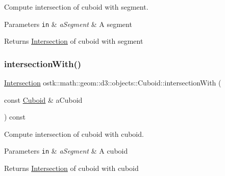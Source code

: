 Compute intersection of cuboid with segment. 


\begin{DoxyParams}[1]{Parameters}
\mbox{\tt in}  & {\em a\+Segment} & A segment \\
\hline
\end{DoxyParams}
\begin{DoxyReturn}{Returns}
\hyperlink{classostk_1_1math_1_1geom_1_1d3_1_1_intersection}{Intersection} of cuboid with segment 
\end{DoxyReturn}
\mbox{\label{classostk_1_1math_1_1geom_1_1d3_1_1objects_1_1_cuboid_af945b79b88ec89ae5c2a9f9624668cb9}} 
\subsubsection{\texorpdfstring{intersection\+With()}{intersectionWith()}\hspace{0.1cm}{\footnotesize\ttfamily [4/5]}}
{\footnotesize\ttfamily \hyperlink{classostk_1_1math_1_1geom_1_1d3_1_1_intersection}{Intersection} ostk\+::math\+::geom\+::d3\+::objects\+::\+Cuboid\+::intersection\+With (\begin{DoxyParamCaption}\item[{const \hyperlink{classostk_1_1math_1_1geom_1_1d3_1_1objects_1_1_cuboid}{Cuboid} \&}]{a\+Cuboid }\end{DoxyParamCaption}) const}



Compute intersection of cuboid with cuboid. 


\begin{DoxyParams}[1]{Parameters}
\mbox{\tt in}  & {\em a\+Segment} & A cuboid \\
\hline
\end{DoxyParams}
\begin{DoxyReturn}{Returns}
\hyperlink{classostk_1_1math_1_1geom_1_1d3_1_1_intersection}{Intersection} of cuboid with cuboid 
\end{DoxyReturn}
\mbox{\label{classostk_1_1math_1_1geom_1_1d3_1_1objects_1_1_cuboid_a583a87ed4da890236e672e4dd3fbcbab}} 
